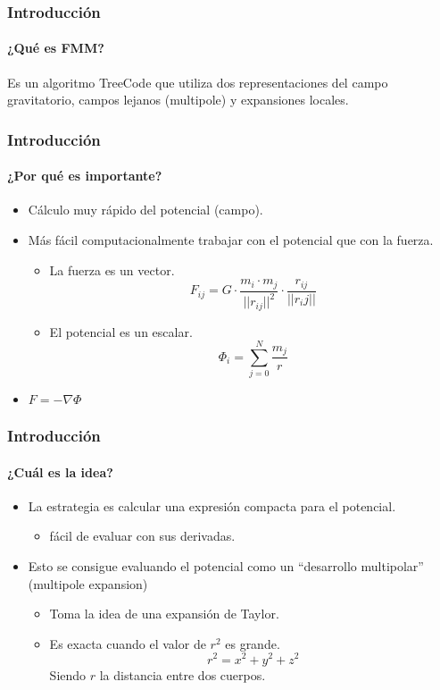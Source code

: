 \begin{frame}
    \frametitle{Introducción}
    \framesubtitle{¿Qué es FMM?}

    \begin{center}
        Es un algoritmo TreeCode que utiliza dos representaciones del campo gravitatorio,
        campos lejanos (multipole) y expansiones locales.
    \end{center}
\end{frame}

\begin{frame}
    \frametitle{Introducción}
    \framesubtitle{¿Por qué es importante?}

    \begin{itemize}
        \item Cálculo muy rápido del potencial (campo).
        \item Más fácil computacionalmente trabajar con el potencial que con la fuerza.
        \begin{itemize}
            \item La fuerza es un vector. $$F_{ij} =G \cdot \frac{m_i \cdot m_j}{||r_{ij}||^{2}} \cdot \frac{r_{ij}}{||r_ij||}$$
            \item El potencial es un escalar. $$\Phi_{i} = \sum_{j=0}^{N} \frac{m_{j}}{r}$$
        \end{itemize}
        \item $F = - \nabla \Phi $
    \end{itemize}
\end{frame}


\begin{frame}
    \frametitle{Introducción}
    \framesubtitle{¿Cuál es la idea?}

    \begin{itemize}
        \item La estrategia es calcular una expresión compacta para el potencial.
        \begin{itemize}
            \item fácil de evaluar con sus derivadas.
        \end{itemize}
        \item Esto se consigue evaluando el potencial como un ``desarrollo multipolar'' (multipole expansion)
        \begin{itemize}
            \item Toma la idea de una expansión de Taylor.
            \item Es exacta cuando el valor de $r^2$ es grande.
                $$r^{2} = x^{2} + y^{2} + z^{2}$$
                  Siendo $r$ la distancia entre dos cuerpos.
        \end{itemize}
    \end{itemize}
\end{frame}

